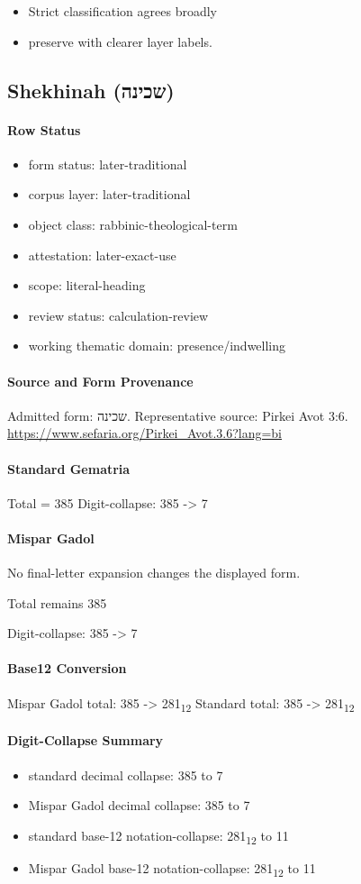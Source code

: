 \begin{itemize}
\item Strict classification agrees broadly
\item preserve with clearer layer labels.
\end{itemize}

\subsection{Shekhinah (שכינה)}
\paragraph{Row Status}
\begin{itemize}
\item form status: later-traditional
\item corpus layer: later-traditional
\item object class: rabbinic-theological-term
\item attestation: later-exact-use
\item scope: literal-heading
\item review status: calculation-review
\item working thematic domain: presence/indwelling
\end{itemize}
\paragraph{Source and Form Provenance}
Admitted form: שכינה.
Representative source: Pirkei Avot 3:6.
\url{https://www.sefaria.org/Pirkei_Avot.3.6?lang=bi}
\paragraph{Standard Gematria}
Total = 385
Digit-collapse: 385 -> 7
\paragraph{Mispar Gadol}
No final-letter expansion changes the displayed form.

Total remains 385

Digit-collapse: 385 -> 7
\paragraph{Base12 Conversion}
Mispar Gadol total: 385 -> 281\textsubscript{12}
Standard total: 385 -> 281\textsubscript{12}
\paragraph{Digit-Collapse Summary}
\begin{itemize}
\item standard decimal collapse: 385 to 7
\item Mispar Gadol decimal collapse: 385 to 7
\item standard base-12 notation-collapse: 281\textsubscript{12} to 11
\item Mispar Gadol base-12 notation-collapse: 281\textsubscript{12} to 11
\end{itemize}
